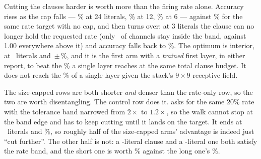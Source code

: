 \begin{table}[h]
\centering\small
\caption{The size sweep, all at the $20\%$ firing-rate target that won Table~\ref{tab:calib}.
 is the requested maximum clause size and  what the controller
achieved;  and  are the resulting firing rates in percent,  the fraction of channels still inside the rate tolerance. The uncalibrated greedy layer
has \densityGreedySize\ literals; the random control has three.}
\label{tab:size}
\end{table}

\begin{ttkey}
Cutting the clauses harder is worth more than the firing rate alone. Accuracy rises as the cap
falls --- \accMctmSizeKTwoFour{}\% at 24 literals, \accMctmSizeKOneTwo{}\% at 12,
\accMctmSizeKSix{}\% at 6 --- against \accMctmCalibRTwoZero{}\% for the same rate target with
no cap, and then turns over: at 3 literals the clause can no longer hold the requested rate
(only \inbandMctmSizeKThree\ of channels stay inside the band, against 1.00 everywhere above
it) and accuracy falls back to \accMctmSizeKThree{}\%. The optimum is interior, at
\sizeBestTarget\ literals and \sizeBestAcc\,$\pm$\,\sizeBestSd{}\%, and it is the first arm with a
\emph{trained} first layer, in either report, to beat the \accSingleMatched{}\% a single layer
reaches at the same total clause budget. It does not reach the \accSingleRf{}\% of a single
layer given the stack's $9\times9$ receptive field.
\end{ttkey}

 The
size-capped rows are both shorter \emph{and} denser than the rate-only row, so the two are
worth disentangling. The control row does it.  asks for the same
$20\%$ rate with the tolerance band narrowed from $2\times$ to $1.2\times$, so the walk cannot
stop at the band edge and has to keep cutting until it lands on the target. It ends at
\calibSizeMctmCalibRTwoZeroTight\ literals and \accMctmCalibRTwoZeroTight{}\%, so roughly half
of the size-capped arms' advantage is indeed just ``cut further''. The other half is not: a
\calibSizeMctmCalibRTwoZeroTight-literal clause and a \calibSizeMctmSizeKSix-literal one both
satisfy the rate band, and the short one is worth \sizeBestAcc{}\% against the long one's
\accMctmCalibRTwoZeroTight{}\%.

